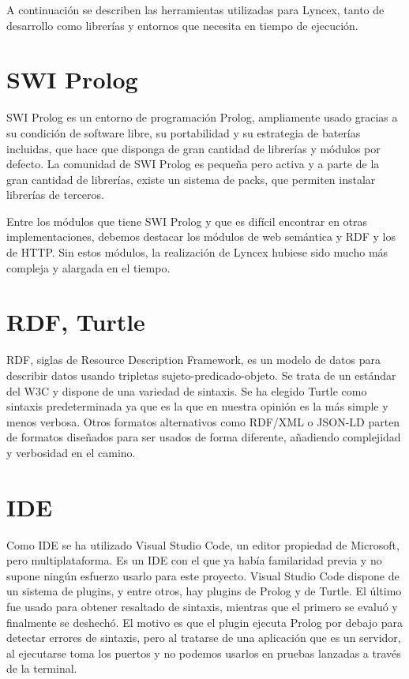 \documentclass[12pt]{report} %
\begin{document}
A continuación se describen las herramientas utilizadas para Lyncex, tanto de desarrollo como librerías y entornos que necesita en tiempo de ejecución.
\section{SWI Prolog}
SWI Prolog\cite{prolog} es un entorno de programación Prolog, ampliamente usado gracias a su condición de software libre, su portabilidad y 
su estrategia de baterías incluidas, que hace que disponga de gran cantidad de librerías y módulos por defecto.
La comunidad de SWI Prolog es pequeña pero activa y a parte de la gran cantidad de librerías, existe un sistema de packs, que permiten instalar librerías de terceros.

Entre los módulos que tiene SWI Prolog y que es difícil encontrar en otras implementaciones, debemos destacar los módulos de web semántica y RDF y los de HTTP.
Sin estos módulos, la realización de Lyncex hubiese sido mucho más compleja y alargada en el tiempo.

\section{RDF, Turtle}
RDF, siglas de Resource Description Framework, es un modelo de datos para describir datos usando tripletas sujeto-predicado-objeto. 
Se trata de un estándar del W3C y dispone de una variedad de sintaxis. Se ha elegido Turtle como sintaxis predeterminada ya que es la que en nuestra opinión es la más simple y menos verbosa.
Otros formatos alternativos como RDF/XML o JSON-LD parten de formatos diseñados para ser usados de forma diferente, añadiendo complejidad y verbosidad en el camino.

\section{IDE}
Como IDE se ha utilizado Visual Studio Code\cite{vscode}, un editor propiedad de Microsoft, pero multiplataforma.
Es un IDE con el que ya había familaridad previa y no supone ningún esfuerzo usarlo para este proyecto.
Visual Studio Code dispone de un sistema de plugins, y entre otros, hay plugins de Prolog y de Turtle.
El último fue usado para obtener resaltado de sintaxis, mientras que el primero se evaluó y finalmente se deshechó.
El motivo es que el plugin ejecuta Prolog por debajo para detectar errores de sintaxis, pero al tratarse de una aplicación que es un servidor, al ejecutarse toma los puertos y no podemos usarlos
en pruebas lanzadas a través de la terminal.
\end{document}
